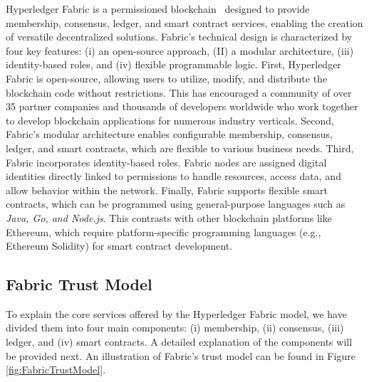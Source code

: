 \documentclass[conference]{IEEEtran}
\begin{document}
Hyperledger Fabric is a permissioned blockchain~\cite{04} designed to provide membership, consensus, ledger, and smart contract services, enabling the creation of versatile decentralized solutions. Fabric's technical design is characterized by four key features: (i) an open-source approach, (II) a modular architecture, (iii) identity-based roles, and (iv) flexible programmable logic. First, Hyperledger Fabric is open-source, allowing users to utilize, modify, and distribute the blockchain code without restrictions. This has encouraged a community of over 35 partner companies and thousands of developers worldwide who work together to develop blockchain applications for numerous industry verticals. Second, Fabric's modular architecture enables configurable membership, consensus, ledger, and smart contracts, which are flexible to various business needs. Third, Fabric incorporates identity-based roles. Fabric nodes are assigned digital identities directly linked to permissions to handle resources, access data, and allow behavior within the network. Finally, Fabric supports flexible smart contracts, which can be programmed using general-purpose languages such as \textit{Java, Go, and Node.js}. This contrasts with other blockchain platforms like Ethereum, which require platform-specific programming languages (e.g., Ethereum Solidity) for smart contract development. 
\subsection{Fabric Trust Model}
To explain the core services offered by the Hyperledger Fabric model, we have divided them into four main components: (i) membership, (ii) consensus, (iii) ledger, and (iv) smart contracts. A detailed explanation of the components will be provided next. An illustration of Fabric's trust model can be found in Figure \ref{fig:FabricTrustModel}. \\ 
%
\end{document}
